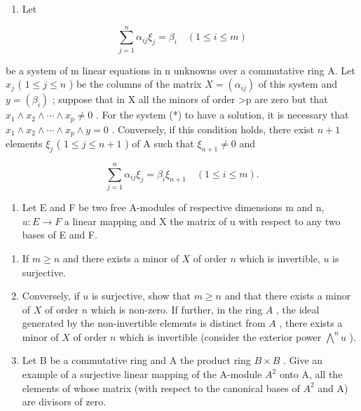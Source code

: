 \begin{enumerate}
\def\labelenumi{\arabic{enumi}.}
\setcounter{enumi}{16}
\tightlist
\item
  Let
\end{enumerate}

\[
\sum_ {j = 1} ^ {n} \alpha_ {i j} \xi_ {j} = \beta_ {i} \quad (1 \leqslant i \leqslant m)\tag{*}
\]

be a system of m linear equations in n unknowns over a commutative ring A. Let \(x_{j}\) ( \(1 \leqslant j \leqslant n\) ) be the columns of the matrix \(X = (\alpha_{ij})\) of this system and \(y = (\beta_{i})\) ; suppose that in X all the minors of order \textgreater p are zero but that \(x_{1} \wedge x_{2} \wedge \cdots \wedge x_{p} \neq 0\) . For the system (*) to have a solution, it is necessary that \(x_{1} \wedge x_{2} \wedge \cdots \wedge x_{p} \wedge y = 0\) . Conversely, if this condition holds, there exist \(n + 1\) elements \(\xi_{j}\) ( \(1 \leqslant j \leqslant n + 1\) ) of A such that \(\xi_{n+1} \neq 0\) and

\[
\sum_ {j = 1} ^ {n} \alpha_ {i j} \xi_ {j} = \beta_ {i} \xi_ {n + 1} \quad (1 \leqslant i \leqslant m).
\]

\begin{enumerate}
\def\labelenumi{\arabic{enumi}.}
\setcounter{enumi}{17}
\tightlist
\item
  Let E and F be two free A-modules of respective dimensions m and n, \(u:E \rightarrow F\) a linear mapping and X the matrix of u with respect to any two bases of E and F.
\end{enumerate}

\begin{enumerate}
\def\labelenumi{(\alph{enumi})}
\item
  If \(m \geqslant n\) and there exists a minor of \(X\) of order \(n\) which is invertible, \(u\) is surjective.
\item
  Conversely, if \(u\) is surjective, show that \(m \geqslant n\) and that there exists a minor of \(X\) of order \(n\) which is non-zero. If further, in the ring \(A\) , the ideal generated by the non-invertible elements is distinct from \(A\) , there exists a minor of \(X\) of order \(n\) which is invertible (consider the exterior power \(\bigwedge^{n}u\) ).
\item
  Let B be a commutative ring and A the product ring \(B \times B\) . Give an example of a surjective linear mapping of the A-module \(A^{2}\) onto A, all the elements of whose matrix (with respect to the canonical bases of \(A^{2}\) and A) are divisors of zero.
\end{enumerate}


